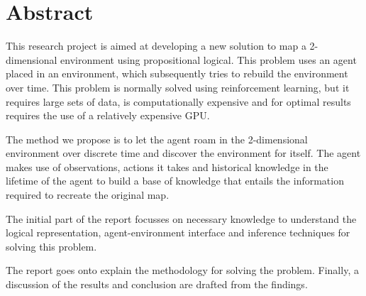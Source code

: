 \chapter{Abstract}

%
%

This research project is aimed at developing a new solution to map a 2-dimensional environment using propositional logical. This problem uses an agent placed in an environment, which subsequently tries to rebuild the environment over time. This problem is normally solved using reinforcement learning, but it requires large sets of data, is computationally expensive and for optimal results requires the use of a relatively expensive GPU.

The method we propose is to let the agent roam in the 2-dimensional environment over discrete time and discover the environment for itself.
The agent makes use of observations, actions it takes and historical knowledge in the lifetime of the agent to build a base of knowledge that entails the information required to recreate the original map. 

The initial part of the report focusses on necessary knowledge to understand the logical representation, agent-environment interface and inference techniques for solving this problem. 

The report goes onto explain the methodology for solving the problem.
Finally, a discussion of the results and conclusion are drafted from the findings.

